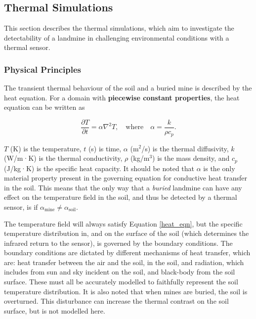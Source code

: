 \subsection{Thermal Simulations} \label{compvis_thermalsims}

    This section describes the thermal simulations, which aim to investigate the detectability of a landmine in challenging environmental conditions with a thermal sensor.
    
    \subsubsection{Physical Principles} \label{physical_principles}
    
         \noindent The transient thermal behaviour of the soil and a buried mine is described by the heat equation. For a domain with \textbf{piecewise constant properties}, the heat equation can be written as
        
        \begin{equation} \label{heat_eqn}
            \frac{\partial T}{\partial t} = \alpha \nabla^2 T, \quad \text{where} \quad \alpha = \frac{k}{\rho c_p}.
        \end{equation}
    
        \noindent \( T \) (K) is the temperature, \( t \) (s) is time, \( \alpha \) (m$^2$/s) is the thermal diffusivity, \( k \) (W/m·K) is the thermal conductivity, \( \rho \) (kg/m$^3$) is the mass density, and \( c_p \) (J/kg·K) is the specific heat capacity. It should be noted that \(\alpha\) is the only material property present in the governing equation for conductive heat transfer in the soil. This means that the only way that a \textit{buried} landmine can have any effect on the temperature field in the soil, and thus be detected by a thermal sensor, is if \(\alpha_{\text{mine}} \neq \alpha_{\text{soil}} \).
    
        The temperature field will always satisfy Equation \ref{heat_eqn}, but the specific temperature distribution in, and on the surface of the soil (which determines the infrared return to the sensor), is governed by the boundary conditions. The boundary conditions are dictated by different mechanisms of heat transfer, which are: \label{sec:cv_architecture_comparison} heat transfer between the air and the soil, \label{sec:cv_architecture_comparison} in the soil, and radiation, which includes \label{sec:cv_architecture_comparison} from sun and sky incident on the soil, and black-body \label{sec:cv_architecture_comparison} from the soil surface. These must all be accurately modelled to faithfully represent the soil temperature distribution. It is also noted that when mines are buried, the soil is overturned. This disturbance can increase the thermal contrast on the soil surface, but is not modelled here.
            
